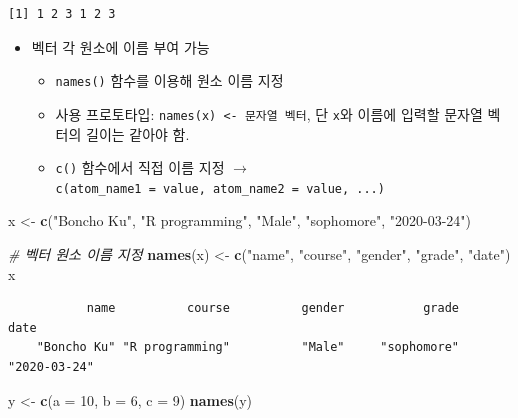 \documentclass[
  11pt,
]{krantz}
\newenvironment{Shaded}{\begin{snugshade}}{\end{snugshade}}
\newcommand{\CommentTok}[1]{\textcolor[rgb]{0.37,0.37,0.37}{\textit{#1}}}
\newcommand{\DataTypeTok}[1]{\textcolor[rgb]{0.27,0.27,0.27}{#1}}
\newcommand{\DecValTok}[1]{\textcolor[rgb]{0.06,0.06,0.06}{#1}}
\newcommand{\KeywordTok}[1]{\textcolor[rgb]{0.27,0.27,0.27}{\textbf{#1}}}
\newcommand{\NormalTok}[1]{#1}
\newcommand{\StringTok}[1]{\textcolor[rgb]{0.5,0.5,0.5}{#1}}
\providecommand{\tightlist}{%
  \setlength{\itemsep}{0pt}\setlength{\parskip}{0pt}}
\begin{document}
\begin{verbatim}
[1] 1 2 3 1 2 3
\end{verbatim}

\normalsize

\begin{itemize}
\tightlist
\item
  벡터 각 원소에 이름 부여 가능

  \begin{itemize}
  \tightlist
  \item
    \texttt{names()} 함수를 이용해 원소 이름 지정
  \item
    사용 프로토타입: \texttt{names(x)\ \textless{}-\ 문자열\ 벡터}, 단 \texttt{x}와 이름에 입력할 문자열 벡터의 길이는 같아야 함.
  \item
    \texttt{c()} 함수에서 직접 이름 지정 \(\rightarrow\) \texttt{c(atom\_name1\ =\ value,\ atom\_name2\ =\ value,\ ...)}
  \end{itemize}
\end{itemize}

\footnotesize

\begin{Shaded}
\begin{Highlighting}[]
\NormalTok{x <-}\StringTok{ }\KeywordTok{c}\NormalTok{(}\StringTok{"Boncho Ku"}\NormalTok{, }\StringTok{"R programming"}\NormalTok{, }\StringTok{"Male"}\NormalTok{, }\StringTok{"sophomore"}\NormalTok{, }\StringTok{"2020-03-24"}\NormalTok{)}

\CommentTok{# 벡터 원소 이름 지정}
\KeywordTok{names}\NormalTok{(x) <-}\StringTok{ }\KeywordTok{c}\NormalTok{(}\StringTok{"name"}\NormalTok{, }\StringTok{"course"}\NormalTok{, }\StringTok{"gender"}\NormalTok{, }\StringTok{"grade"}\NormalTok{, }\StringTok{"date"}\NormalTok{) }
\NormalTok{x}
\end{Highlighting}
\end{Shaded}

\begin{verbatim}
           name          course          gender           grade            date 
    "Boncho Ku" "R programming"          "Male"     "sophomore"    "2020-03-24" 
\end{verbatim}

\begin{Shaded}
\begin{Highlighting}[]
\NormalTok{y <-}\StringTok{ }\KeywordTok{c}\NormalTok{(}\DataTypeTok{a =} \DecValTok{10}\NormalTok{, }\DataTypeTok{b =} \DecValTok{6}\NormalTok{, }\DataTypeTok{c =} \DecValTok{9}\NormalTok{)}
\KeywordTok{names}\NormalTok{(y)}
\end{Highlighting}
\end{Shaded}
\end{document}
